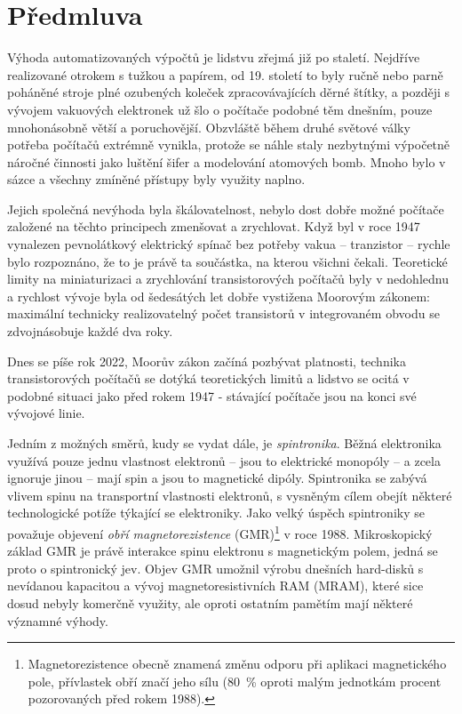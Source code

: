 \chapter*{Předmluva}
Výhoda automatizovaných výpočtů je lidstvu zřejmá již po staletí.
Nejdříve realizované otrokem s tužkou a papírem, od 19. století to byly ručně nebo parně poháněné stroje plné ozubených koleček zpracovávajících děrné štítky, a později s vývojem vakuových elektronek už šlo o počítače podobné těm dnešním, pouze mnohonásobně větší a poruchovější.
Obzvláště během druhé světové války potřeba počítačů extrémně vynikla, protože se náhle staly nezbytnými výpočetně náročné činnosti jako luštění šifer a modelování atomových bomb.
Mnoho bylo v sázce a všechny zmíněné přístupy byly využity naplno.

Jejich společná nevýhoda byla škálovatelnost, nebylo dost dobře možné počítače založené na těchto principech zmenšovat a zrychlovat.
Když byl v roce 1947 vynalezen pevnolátkový elektrický spínač bez potřeby vakua -- tranzistor -- rychle bylo rozpoznáno, že to je právě ta součástka, na kterou všichni čekali.
Teoretické limity na miniaturizaci a zrychlování transistorových počítačů byly v nedohlednu a rychlost vývoje byla od šedesátých let dobře vystižena Moorovým zákonem: maximální technicky realizovatelný počet transistorů v integrovaném obvodu se zdvojnásobuje každé dva roky.

Dnes se píše rok 2022, Moorův zákon začíná pozbývat platnosti, technika transistorových počítačů se dotýká teoretických limitů a lidstvo se ocitá v podobné situaci jako před rokem 1947 - stávající počítače jsou na konci své vývojové linie.

Jedním z možných směrů, kudy se vydat dále, je \emph{spintronika}.
Běžná elektronika využívá pouze jednu vlastnost elektronů -- jsou to elektrické monopóly -- a zcela ignoruje jinou -- mají spin a jsou to magnetické dipóly.
Spintronika se zabývá vlivem spinu na transportní vlastnosti elektronů, s vysněným cílem obejít některé technologické potíže týkající se elektroniky.
Jako velký úspěch spintroniky se považuje objevení \emph{obří magnetorezistence} (GMR)\footnote{Magnetorezistence obecně znamená změnu odporu při aplikaci magnetického pole, přívlastek obří značí jeho sílu (\SI{80}{\percent} oproti malým jednotkám procent pozorovaných před rokem 1988).} v roce 1988.
Mikroskopický základ GMR je právě interakce spinu elektronu s magnetickým polem, jedná se proto o spintronický jev.
Objev GMR umožnil výrobu dnešních hard-disků s nevídanou kapacitou a vývoj magnetoresistivních RAM (MRAM), které sice dosud nebyly komerčně využity, ale oproti ostatním pamětím mají některé významné výhody.

